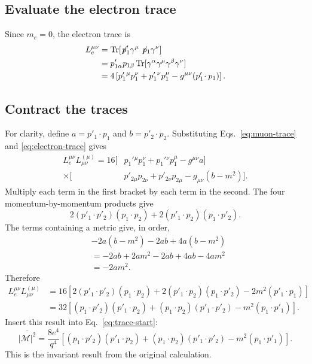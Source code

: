 \documentclass[12pt,a4paper]{article}
\numberwithin{equation}{section}
\newcommand{\M}{\mathcal M}
\newcommand{\slsh}[1]{\not\!#1}
\begin{document}
\subsection{Evaluate the electron trace}
Since $m_e=0$, the electron trace is
\begin{align}
 L_e^{\mu\nu}
 &=\operatorname{Tr}[\slsh p'_1\gamma^\mu\slsh p_1\gamma^\nu]\\
 &=p'_{1\alpha}p_{1\beta}
   \operatorname{Tr}[\gamma^\alpha\gamma^\mu\gamma^\beta\gamma^\nu]\\
 &=4\left[p_1'{}^\mu p_1^\nu+p_1'{}^\nu p_1^\mu
       -g^{\mu\nu}(p'_1\!\cdot p_1)\right].
 \label{eq:electron-trace}
\end{align}

\subsection{Contract the traces}
For clarity, define $a=p'_1\!\cdot p_1$ and
$b=p'_2\!\cdot p_2$. Substituting Eqs.~\eqref{eq:muon-trace} and
\eqref{eq:electron-trace} gives
\begin{align}
 L_e^{\mu\nu}L^{(\mu)}_{\mu\nu}
 =16[&p_1'{}^\mu p_1^\nu+p_1'{}^\nu p_1^\mu-g^{\mu\nu}a]\\
 \times[&p'_{2\mu}p_{2\nu}+p'_{2\nu}p_{2\mu}
             -g_{\mu\nu}(b-m^2)].
\end{align}
Multiply each term in the first bracket by each term in the second. The four
momentum-by-momentum products give
\begin{equation}
 2(p'_1\!\cdot p'_2)(p_1\!\cdot p_2)
 +2(p'_1\!\cdot p_2)(p_1\!\cdot p'_2).
\end{equation}
The terms containing a metric give, in order,
\begin{align}
 &-2a(b-m^2)-2ab+4a(b-m^2)\\
 &=-2ab+2am^2-2ab+4ab-4am^2\\
 &=-2am^2.
\end{align}
Therefore
\begin{align}
 L_e^{\mu\nu}L^{(\mu)}_{\mu\nu}
 &=16\left[2(p'_1\!\cdot p'_2)(p_1\!\cdot p_2)
 +2(p'_1\!\cdot p_2)(p_1\!\cdot p'_2)-2m^2(p'_1\!\cdot p_1)\right]\\
 &=32\left[(p_1\!\cdot p'_2)(p'_1\!\cdot p_2)
 +(p_1\!\cdot p_2)(p'_1\!\cdot p'_2)-m^2(p_1\!\cdot p'_1)\right].
\end{align}
Insert this result into Eq.~\eqref{eq:trace-start}:
\begin{equation}
 \boxed{\overline{|\M|^2}=\frac{8e^4}{q^4}
 \left[(p_1\!\cdot p'_2)(p'_1\!\cdot p_2)
 +(p_1\!\cdot p_2)(p'_1\!\cdot p'_2)-m^2(p_1\!\cdot p'_1)\right].}
 \label{eq:invariant-result}
\end{equation}
This is the invariant result from the original calculation.
\end{document}
